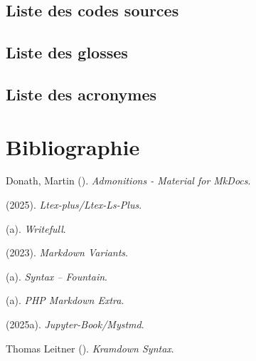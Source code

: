 \documentclass[a4paper,12pt]{article}
\begin{document}
\subsection{Liste des codes sources}
\label{sec:org2666e37}
\renewcommand{\lstlistingname}{\vspace{-2em}}
\lstlistoflistings
\subsection{Liste des glosses}
\label{sec:org7f3386f}
\begin{multicols}{2}\small{

}\end{multicols}
\subsection{Liste des acronymes}
\label{sec:org14b0d28}
\begin{multicols}{2}\small{

}\clearpage\end{multicols}
\section{Bibliographie}
\label{sec:orgff93bde}
\begin{multicols}{2}\small{
\noindent
Donath, Martin (). \emph{Admonitions - {{Material}} for {{MkDocs}}}.

\noindent
 (2025). \emph{Ltex-plus/Ltex-Ls-Plus}.

\noindent
 (a). \emph{Writefull}.

\noindent
 (2023). \emph{Markdown {{Variants}}}.

\noindent
 (a). \emph{Syntax – {{Fountain}}}.

\noindent
 (a). \emph{{{PHP Markdown Extra}}}.

\noindent
 (2025a). \emph{Jupyter-Book/Mystmd}.

\noindent
{Thomas Leitner} (). \emph{Kramdown {{Syntax}}}.
}\clearpage\end{multicols}
\end{document}

